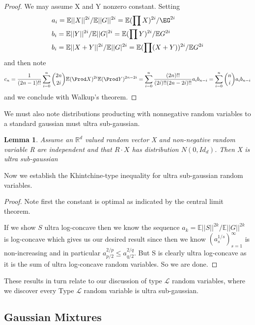 \documentclass[10pt]{article}
\newcommand{\E}{\mathbb{E}}
\newcommand{\1}{\textbf{1}}
\newcommand{\R}{\mathbb{R}}
\newtheorem{lemma}[theorem]{Lemma}
\theoremstyle{remark}
\theoremstyle{definition}
\begin{document}
\begin{proof}
	We may assume X and Y nonzero constant. Setting
	\begin{align*}
		&a_i = \E||X||^{2i}/\E||G||^{2i} = \E(\prod X)^{2i}/\EG^{2i}\\
		&b_i = \E||Y||^{2i}/\E||G|^{2i} = \E(\prod Y)^{2i}/\E G^{2i}\\
		&b_i = \E||X+Y||^{2i}/\E||G|^{2i} = \E(\prod (X+Y))^{2i}/\E G^{2i}
	\end{align*}
	and then note
	\begin{align*}
		c_n  = \frac{1}{(2n-1)!!}\sum_{i=0}^{n}{2n \choose 2i} \E(\Prod X)^{2i} \E(\Prod Y)^{2n - 2i} = \sum_{i=0}^n \frac{(2n)!!}{(2i)!!(2n-2i)!!}a_ib_{n-i} = \sum_{i=0}^n {n \choose i}a_i b_{n-i}
	\end{align*}
	and we conclude with Walkup's theorem.
\end{proof}

We must also note distributions producting with nonnegative random variables to a standard gaussian must ultra sub-gaussian.

\begin{lemma}
	Assume an $\R^d$ valued random vector X and non-negative random variable R are independent and that $R \cdot X$ has distribution $N(0,I d_d)$. Then X is ultra sub-gaussian
\end{lemma}

Now we establish the Khintchine-type inequality for ultra sub-gaussian random variables.

\begin{proof}
	Note first the constant is optimal as indicated by the central limit theorem.

	If we show $S$ ultra log-concave then we know the sequence $a_k = \E||S||^{2k}/\E||G||^{2k}$ is log-concave which gives us our desired result since then we know $(a_s^{1/s})_{s=1}^{\infty}$ is non-increasing and in particular $a_{p/2}^{2/p} \leq a_{q/2}^{2/q}$. But S is clearly ultra log-concave as it is the sum of ultra log-concave random variables. So we are done.
\end{proof}

These results in turn relate to our discussion of type $\mathcal{L}$ random variables, where we discover every Type $\mathcal{L}$ random variable is ultra sub-gaussian.


\subsection{Gaussian Mixtures}
\end{document}
